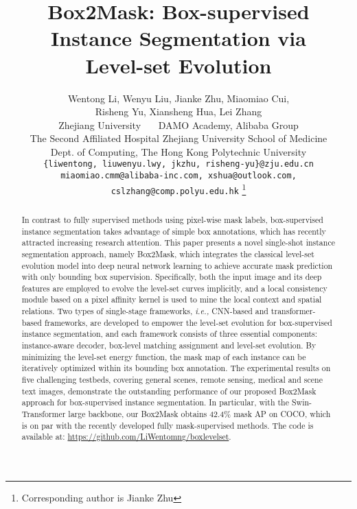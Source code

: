\documentclass[12pt,onecolumn,letterpaper]{article}
\newcommand\blfootnote[1]{\begingroup
  \renewcommand\thefootnote{}\thanks{#1}\endgroup
}
\begin{document}
\title{Box2Mask: Box-supervised Instance Segmentation via \\ Level-set Evolution}

\author{{\normalsize Wentong Li, Wenyu Liu, Jianke Zhu, Miaomiao Cui,} \\ {\normalsize Risheng Yu,  Xiansheng Hua, Lei Zhang} \\ 
{\normalsize Zhejiang University \ \ \ DAMO Academy, Alibaba Group} \\
{\normalsize The Second Affiliated Hospital Zhejiang University School of Medicine} \\
{\normalsize Dept. of Computing, The Hong Kong Polytechnic University} \\
{\tt\small \{liwentong, liuwenyu.lwy, jkzhu, risheng-yu\}@zju.edu.cn} \\
{\tt\small miaomiao.cmm@alibaba-inc.com, xshua@outlook.com, cslzhang@comp.polyu.edu.hk}
\blfootnote{Corresponding author is Jianke Zhu}
}

\maketitle
\ificcvfinal\thispagestyle{empty}\fi

\begin{abstract}
      In contrast to fully supervised methods using pixel-wise mask labels, box-supervised instance segmentation takes advantage of simple box annotations, which has recently attracted increasing research attention. This paper presents a novel single-shot instance segmentation approach, namely Box2Mask, which integrates the classical level-set evolution model into deep neural network learning to achieve accurate mask prediction with only bounding box supervision.
      Specifically, both the input image and its deep features are employed to evolve the level-set curves implicitly, and a local consistency module based on a pixel affinity kernel is used to mine the local context and spatial relations.
      Two types of single-stage frameworks, \textit{i.e.,} CNN-based and transformer-based frameworks, are developed to empower the level-set evolution for box-supervised instance segmentation, and each framework consists of three essential components: instance-aware decoder, box-level matching assignment and level-set evolution. By minimizing the level-set energy function, the mask map of each instance can be iteratively optimized within its bounding box annotation. The experimental results on five challenging testbeds, covering general scenes, remote sensing, medical and scene text images, demonstrate the outstanding performance of our proposed Box2Mask approach for box-supervised instance segmentation. In particular, with the Swin-Transformer large backbone, our Box2Mask obtains 42.4\% mask AP on COCO, which is on par with the recently developed fully mask-supervised methods. The code is available at:  \href{https://github.com/LiWentomng/boxlevelset}{https://github.com/LiWentomng/boxlevelset}.
\end{abstract}
\end{document}

